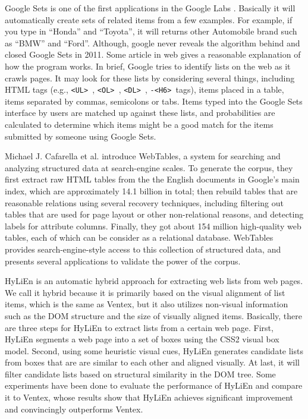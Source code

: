 
Google Sets\cite{googlesets} is one of the first applications in the Google Labs \cite{googlelabs}.
Basically it will automatically create sets of related items from a few examples.
For example, if you type in ``Honda'' and ``Toyota'', it will returns other Automobile brand such as ``BMW'' and ``Ford''.
Although, google never reveals the algorithm behind and closed Google Sets in 2011.
Some article\cite{howGoogleSetsWorks} in web gives a reasonable explanation of how the program works.
In brief, Google tries to identify lists on the web as it crawls pages.
It may look for these lists by considering several things, including
HTML tags (e.g., {\tt <UL> }, {\tt<OL> }, {\tt<DL> }, {\tt <H1>-<H6> }tags),
items placed in a table, items separated by commas, semicolons or tabs.
Items typed into the Google Sets interface by users are matched up against these lists,
and probabilities are calculated to determine
which items might be a good match for the items submitted by someone using Google Sets.

Michael J. Cafarella et al.\cite{webtables08} introduce WebTables,
a system for searching and analyzing structured data at search-engine scales.
To generate the corpus,
they first extract raw HTML tables from the the English documents in Google's main index,
which are approximately 14.1 billion in total;
then rebuild tables that are reasonable relations using several recovery techniques,
including filtering out tables that are used for page layout or other non-relational reasons,
and detecting labels for attribute columns.
Finally, they got about 154 million high-quality web tables,
each of which can be consider as a relational database.
WebTables provides search-engine-style access to this collection of
structured data,
and presents several applications to validate the power of the corpus.

HyLiEn \cite{FumarolaWBMH11:List} is an automatic hybrid approach
for extracting web lists from web pages.
We call it hybrid because it is primarily based on the visual alignment of list
items, which is the same as Ventex\cite{GatterbauerBHKP2007:Towards},
but it also utilizes non-visual information such as the
DOM structure and the size of visually aligned items.
Basically, there are three steps for HyLiEn to extract lists from a certain web page.
First, HyLiEn segments a web page into a set of boxes using the CSS2 visual box model\cite{CCS2Box}.
Second, using some heuristic visual cues,
HyLiEn generates candidate lists from boxes that are
are similar to each other and aligned visually.
At last, it will filter candidate lists based on structural
similarity in the DOM tree.
Some experiments have been done to evaluate the performance of HyLiEn and compare it to Ventex,
whose results show that HyLiEn achieves significant improvement and convincingly outperforms Ventex.

